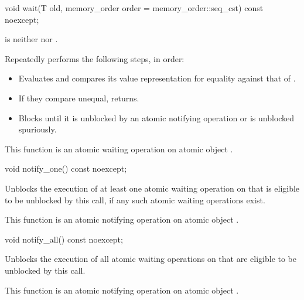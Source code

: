 %
\begin{itemdecl}
void wait(T old, memory_order order = memory_order::seq_cst) const noexcept;
\end{itemdecl}

\begin{itemdescr}
\pnum
\expects
{} is
neither  nor .

\pnum
\effects
Repeatedly performs the following steps, in order:
\begin{itemize}
\item
  Evaluates  and
  compares its value representation for equality against that of .
\item
  If they compare unequal, returns.
\item
  Blocks until it
  is unblocked by an atomic notifying operation or is unblocked spuriously.
\end{itemize}

\pnum
\remarks
This function is an atomic waiting operation
on atomic object .
\end{itemdescr}

%
\begin{itemdecl}
void notify_one() const noexcept;
\end{itemdecl}

\begin{itemdescr}
\pnum
\effects
Unblocks the execution of at least one atomic waiting operation on 
that is eligible to be unblocked by this call,
if any such atomic waiting operations exist.

\pnum
\remarks
This function is an atomic notifying operation
on atomic object .
\end{itemdescr}

%
\begin{itemdecl}
void notify_all() const noexcept;
\end{itemdecl}

\begin{itemdescr}
\pnum
\effects
Unblocks the execution of all atomic waiting operations on 
that are eligible to be unblocked by this call.

\pnum
\remarks
 This function is an atomic notifying operation
 on atomic object .
\end{itemdescr}

